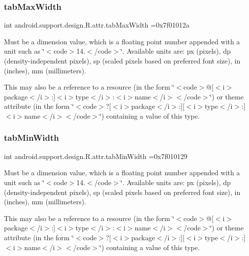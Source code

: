 \subsubsection{\texorpdfstring{tab\+Max\+Width}{tabMaxWidth}}
{\footnotesize\ttfamily int android.\+support.\+design.\+R.\+attr.\+tab\+Max\+Width =0x7f01012a\hspace{0.3cm}{\ttfamily [static]}}

Must be a dimension value, which is a floating point number appended with a unit such as \char`\"{}$<$code$>$14.\+5sp$<$/code$>$\char`\"{}. Available units are\+: px (pixels), dp (density-\/independent pixels), sp (scaled pixels based on preferred font size), in (inches), mm (millimeters). 

This may also be a reference to a resource (in the form \char`\"{}$<$code$>$@\mbox{[}$<$i$>$package$<$/i$>$\+:\mbox{]}$<$i$>$type$<$/i$>$\+:$<$i$>$name$<$/i$>$$<$/code$>$\char`\"{}) or theme attribute (in the form \char`\"{}$<$code$>$?\mbox{[}$<$i$>$package$<$/i$>$\+:\mbox{]}\mbox{[}$<$i$>$type$<$/i$>$\+:\mbox{]}$<$i$>$name$<$/i$>$$<$/code$>$\char`\"{}) containing a value of this type. \mbox{\label{classandroid_1_1support_1_1design_1_1R_1_1attr_aeebab001b7ec8560a919d37c4732c6e9}} 
\subsubsection{\texorpdfstring{tab\+Min\+Width}{tabMinWidth}}
{\footnotesize\ttfamily int android.\+support.\+design.\+R.\+attr.\+tab\+Min\+Width =0x7f010129\hspace{0.3cm}{\ttfamily [static]}}

Must be a dimension value, which is a floating point number appended with a unit such as \char`\"{}$<$code$>$14.\+5sp$<$/code$>$\char`\"{}. Available units are\+: px (pixels), dp (density-\/independent pixels), sp (scaled pixels based on preferred font size), in (inches), mm (millimeters). 

This may also be a reference to a resource (in the form \char`\"{}$<$code$>$@\mbox{[}$<$i$>$package$<$/i$>$\+:\mbox{]}$<$i$>$type$<$/i$>$\+:$<$i$>$name$<$/i$>$$<$/code$>$\char`\"{}) or theme attribute (in the form \char`\"{}$<$code$>$?\mbox{[}$<$i$>$package$<$/i$>$\+:\mbox{]}\mbox{[}$<$i$>$type$<$/i$>$\+:\mbox{]}$<$i$>$name$<$/i$>$$<$/code$>$\char`\"{}) containing a value of this type. \mbox{\label{classandroid_1_1support_1_1design_1_1R_1_1attr_aa7fc1fe2e9256dc49e7439e5799302d3}} 
